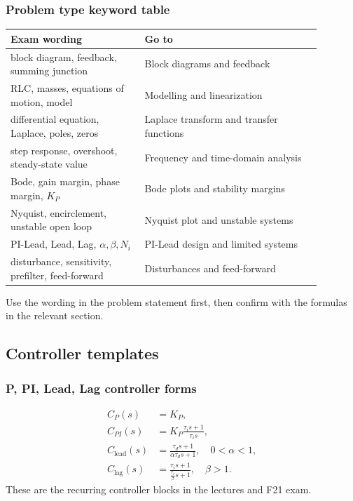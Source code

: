 \subsubsection{Problem type keyword table}
\begin{center}
\begin{tabular}{>{\raggedright\arraybackslash}p{0.38\linewidth}|>{\raggedright\arraybackslash}p{0.50\linewidth}}
\textbf{Exam wording} & \textbf{Go to}\\ \hline
block diagram, feedback, summing junction & Block diagrams and feedback\\
RLC, masses, equations of motion, model & Modelling and linearization\\
differential equation, Laplace, poles, zeros & Laplace transform and transfer functions\\
step response, overshoot, steady-state value & Frequency and time-domain analysis\\
Bode, gain margin, phase margin, \(K_P\) & Bode plots and stability margins\\
Nyquist, encirclement, unstable open loop & Nyquist plot and unstable systems\\
PI-Lead, Lead, Lag, \(\alpha,\beta,N_i\) & PI-Lead design and limited systems\\
disturbance, sensitivity, prefilter, feed-forward & Disturbances and feed-forward
\end{tabular}
\end{center}
Use the wording in the problem statement first, then confirm with the formulas in the relevant section.

\subsection{Controller templates}

\subsubsection{P, PI, Lead, Lag controller forms}
\[
\begin{aligned}
C_P(s)&=K_P,\\
C_{PI}(s)&=K_P\frac{\tau_i s+1}{\tau_i s},\\
C_{\mathrm{lead}}(s)&=\frac{\tau_d s+1}{\alpha\tau_d s+1},\quad 0<\alpha<1,\\
C_{\mathrm{lag}}(s)&=\frac{\tau_i s+1}{\frac{\tau_i}{\beta}s+1},\quad \beta>1.
\end{aligned}
\]
These are the recurring controller blocks in the lectures and F21 exam.

